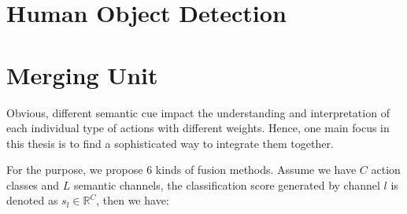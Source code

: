 \section{Human Object Detection}\label{sec:detection}


\section{Merging Unit}\label{sec:fusion}
Obvious, different semantic cue impact the understanding and interpretation of each individual type of actions with different weights.
Hence, one main focus in this thesis is to find a sophisticated way to integrate them together.

For the purpose, we propose 6 kinds of fusion methods.
Assume we have $ C $ action classes and $ L $ semantic channels, the classification score generated by channel $ l $ is denoted as $ s_{l}\in \mathbb{R}^C $, then we have:
